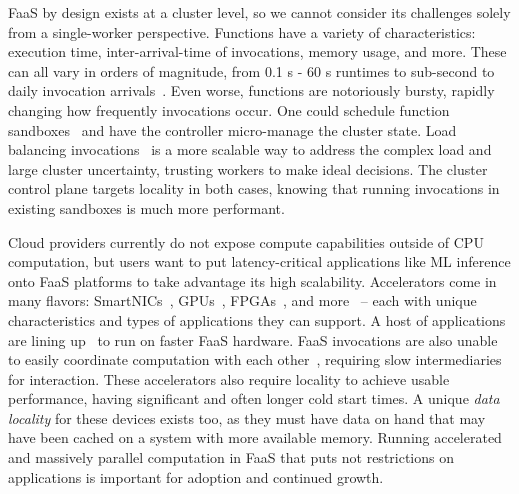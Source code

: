 FaaS by design exists at a cluster level, so we cannot consider its challenges solely from a single-worker perspective.
Functions have a variety of characteristics: execution time, inter-arrival-time of invocations, memory usage, and more.
These can all vary in orders of magnitude, from 0.1 s - 60 s runtimes to sub-second to daily invocation arrivals~\cite{shahrad2020serverless}.
Even worse, functions are notoriously bursty, rapidly changing how frequently invocations occur.
One could schedule function sandboxes~\cite{balaji2021fireplace,kaffes2021practical,abdi2023palette,openwhisk} and have the controller micro-manage the cluster state.
Load balancing invocations~\cite{aumala2019beyond,leegreedy,faaslb-hpdc22} is a more scalable way to address the complex load and large cluster uncertainty, trusting workers to make ideal decisions.
The cluster control plane targets locality in both cases, knowing that running invocations in existing sandboxes is much more performant.

Cloud providers currently do not expose compute capabilities outside of CPU computation, but users want to put latency-critical applications like ML inference onto FaaS platforms to take advantage its high scalability.
Accelerators come in many flavors: SmartNICs~\cite{choi2020lambda}, GPUs~\cite{pemberton2022kernel,guleria2019emf}, FPGAs~\cite{bacis2020blastfunction}, and more~\cite{du2022serverless,romero2021llama} -- each with unique characteristics and types of applications they can support.
A host of applications are lining up~\cite{yang2022infless,ali2022optimizing,zhang2019video,risco2021gpu,hung2019rapid,shankar2020serverless} to run on faster FaaS hardware.
FaaS invocations are also unable to easily coordinate computation with each other~\cite{yuan2022smpi,copik2023fmi,copik2022faaskeeper,sreekanti2020fault,sreekanti2020cloudburst,giantsidi2023flexlog,xu2021lambdadnn}, requiring slow intermediaries for interaction.
These accelerators also require locality to achieve usable performance, having significant and often longer cold start times.
A unique \emph{data locality} for these devices exists too, as they must have data on hand that may have been cached on a system with more available memory.
Running accelerated and massively parallel computation in FaaS that puts not restrictions on applications is important for adoption and continued growth.


